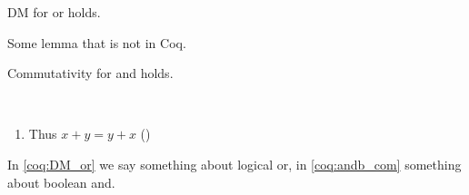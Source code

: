 \documentclass{llncs}
\begin{document}
\begin{theorem}[][DM_or]
  DM for or holds.
\end{theorem}

\begin{lemma}[Name]
  Some lemma that is not in Coq.
\end{lemma}

\begin{fact}
  Commutativity for and holds.
\end{fact}

\begin{fact}~
  \begin{enumerate}
  \coqitem[plus_O] $x + 0 = x$
  \coqitem[plus_S] $x + S y = S (x + y)$
  \item Thus $x + y = y + x$ ()
\end{enumerate}
\end{fact}

In \cref{coq:DM_or} we say something about logical or, in
\autoref{coq:andb_com} something about boolean and.
\end{document}
